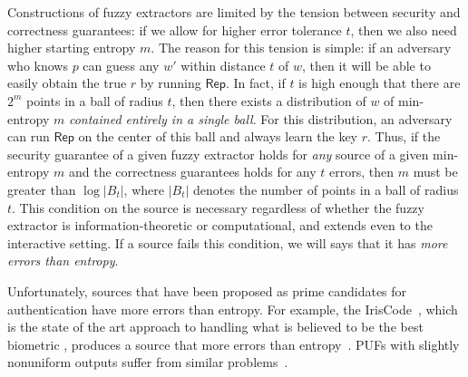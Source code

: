 \documentclass[11pt]{article}
\newcommand{\class}[1]{{\ensuremath{\mathsf{#1}}}}
\newcommand{\rep}{\ensuremath{\class{Rep}}\xspace}
\newcommand{\Huse}{\mathrm{H}_{\mathtt{usable}}}
\begin{document}
Constructions of fuzzy extractors are limited by the tension between security and correctness guarantees: if we allow for higher error tolerance $t$, then we also need higher starting entropy $m$. The reason for this tension is simple: if an adversary who knows $p$ can guess any $w'$ within distance $t$ of $w$, then it will be able to easily obtain the true $r$ by running $\rep$.
In fact, if $t$ is high enough that there are $2^m$ points in a ball of radius $t$, then there exists a distribution of $w$ of min-entropy $m$  \emph{contained entirely in a single ball}.  For this distribution, an adversary can run $\rep$ on the center of this ball and always learn the key $r$.
Thus, if the security guarantee of a given fuzzy extractor holds for \emph{any} source of a given min-entropy $m$ and the correctness guarantees holds for any $t$ errors, then $m$ must   be greater than $\log |B_t|$, where $|B_t|$ denotes the number of points in a ball of radius $t$.  This condition on the source is necessary regardless of whether the fuzzy extractor is information-theoretic or computational, and extends even to the interactive setting.
If a source fails this condition, we will says that it has \emph{more errors than entropy}.




Unfortunately, sources that have been proposed as prime candidates for authentication have more errors than entropy.
For example, the IrisCode~\cite{daugman2004}, which is the state of the art approach to handling what is believed to be the best biometric \cite{prabhakar2003biometric}, produces a source that more errors than entropy~\cite[Section 5]{blanton2009biometric}. PUFs with slightly nonuniform outputs suffer from similar problems~\cite{koeberl2014entropy}.
\end{document}
